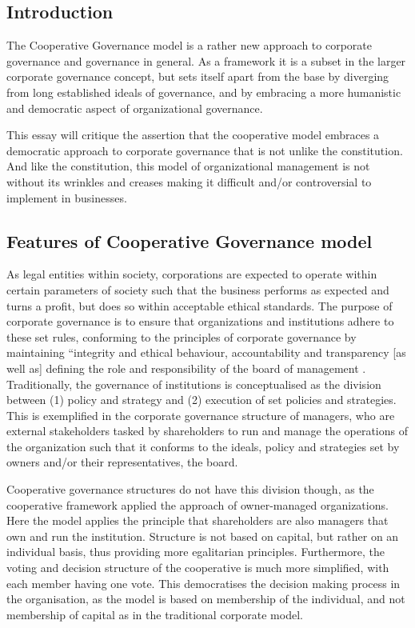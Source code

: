 \documentclass[]{article}
\date{}
\begin{document}
\subsection{Introduction}\label{introduction}

The Cooperative Governance model is a rather new approach to corporate
governance and governance in general. As a framework it is a subset in
the larger corporate governance concept, but sets itself apart from the
base by diverging from long established ideals of governance, and by
embracing a more humanistic and democratic aspect of organizational
governance.

This essay will critique the assertion that the cooperative model
embraces a democratic approach to corporate governance that is not
unlike the constitution. And like the constitution, this model of
organizational management is not without its wrinkles and creases making
it difficult and/or controversial to implement in businesses.

\subsection{Features of Cooperative Governance
model}\label{features-of-cooperative-governance-model}

As legal entities within society, corporations are expected to operate
within certain parameters of society such that the business performs as
expected and turns a profit, but does so within acceptable ethical
standards. The purpose of corporate governance is to ensure that
organizations and institutions adhere to these set rules, conforming to
the principles of corporate governance by maintaining ``integrity and
ethical behaviour, accountability and transparency {[}as well as{]}
defining the role and responsibility of the board of management
\citep{cis17}. Traditionally, the governance of institutions is
conceptualised as the division between (1) policy and strategy and (2)
execution of set policies and strategies. This is exemplified in the
corporate governance structure of managers, who are external
stakeholders tasked by shareholders to run and manage the operations of
the organization such that it conforms to the ideals, policy and
strategies set by owners and/or their representatives, the board.

Cooperative governance structures do not have this division though, as
the cooperative framework applied the approach of owner-managed
organizations. Here the model applies the principle that shareholders
are also managers that own and run the institution. Structure is not
based on capital, but rather on an individual basis, thus providing more
egalitarian principles. Furthermore, the voting and decision structure
of the cooperative is much more simplified, with each member having one
vote. This democratises the decision making process in the organisation,
as the model is based on membership of the individual, and not
membership of capital as in the traditional corporate model.
\end{document}
